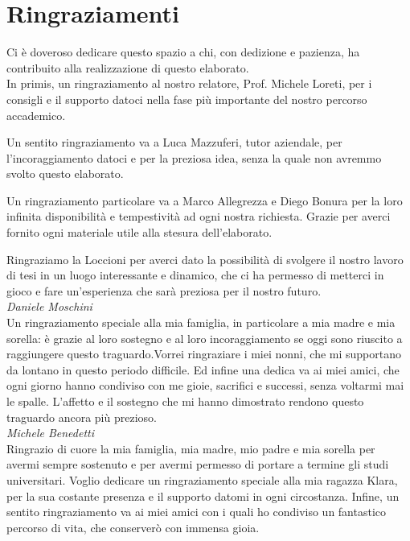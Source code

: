 \chapter*{Ringraziamenti}
Ci è doveroso dedicare questo spazio a chi, con dedizione e pazienza, ha contribuito alla realizzazione di questo elaborato.\\

In primis, un ringraziamento al nostro relatore, Prof. Michele Loreti, per i consigli e il supporto datoci nella fase più importante del nostro percorso accademico.

Un sentito ringraziamento va a Luca Mazzuferi, tutor aziendale, per l'incoraggiamento datoci e per la preziosa idea, senza la quale non avremmo svolto questo elaborato. 

Un ringraziamento particolare va a Marco Allegrezza e Diego Bonura per la loro infinita disponibilità e tempestività ad ogni nostra richiesta. Grazie per averci fornito ogni materiale utile alla stesura dell’elaborato.

Ringraziamo la Loccioni per averci dato la possibilità di svolgere il nostro lavoro di tesi in un luogo interessante e dinamico, che ci ha permesso di metterci in gioco e fare un’esperienza che sarà preziosa per il nostro futuro.\\

\textit{Daniele Moschini}\\
Un ringraziamento speciale alla mia famiglia, in particolare a mia madre e mia sorella: è grazie al loro sostegno e al loro incoraggiamento se oggi sono riuscito a raggiungere questo traguardo.Vorrei ringraziare i miei nonni, che mi supportano da lontano in questo periodo difficile.
Ed infine una dedica va ai miei amici, che ogni giorno hanno condiviso con me gioie, sacrifici e successi, senza voltarmi mai le spalle. L’affetto e il sostegno che mi hanno dimostrato rendono questo traguardo ancora più prezioso.\\

\textit{Michele Benedetti}\\
Ringrazio di cuore la mia famiglia, mia madre, mio padre e mia sorella per avermi sempre sostenuto e per avermi permesso di portare a termine gli studi universitari.
Voglio dedicare un ringraziamento speciale alla mia ragazza Klara, per la sua costante presenza e il supporto datomi in ogni circostanza.
Infine, un sentito ringraziamento va ai miei amici con i quali ho condiviso un fantastico percorso di vita, che conserverò con immensa gioia. 
